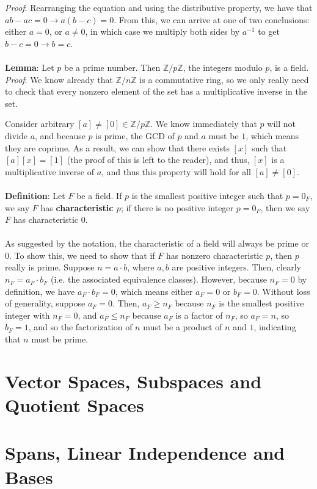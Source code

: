 \documentclass[11pt]{report}
\newcommand{\Z}{\mathbb{Z}}
\begin{document}
\textit{Proof}: Rearranging the equation and using the distributive property, we have that $ab - ac = 0 \rightarrow a(b-c) = 0$. From this, we can arrive at one of two conclusions: either $a = 0$, or $a \ne 0$, in which case we multiply both sides by $a^{-1}$ to get $b - c = 0 \rightarrow b = c$.
\\ \\
\textbf{Lemma}: Let $p$ be a prime number. Then $\Z/p\Z$, the integers modulo $p$, is a field. \\
\textit{Proof}: We know already that $\Z/n\Z$ is a commutative ring, so we only really need to check that every nonzero element of the set has a multiplicative inverse in the set. 

Consider arbitrary $[a] \ne [0] \in \Z/p\Z$. We know immediately that $p$ will not divide $a$, and because $p$ is prime, the GCD of $p$ and $a$ must be $1$, which means they are coprime. As a result, we can show that there exists $[x]$ such that $[a][x] = [1]$ (the proof of this is left to the reader), and thus, $[x]$ is a multiplicative inverse of $a$, and thus this property will hold for all $[a] \ne [0]$.
\\ \\
\textbf{Definition}: Let $F$ be a field. If $p$ is the smallest positive integer such that $p = 0_F$, we say $F$ has \textbf{characteristic $p$}; if there is no positive integer $p = 0_F$, then we say $F$ has characteristic $0$.
\\ \\
As suggested by the notation, the characteristic of a field will always be prime or $0$. To show this, we need to show that if $F$ has nonzero characteristic $p$, then $p$ really is prime. Suppose $n = a \cdot b$, where $a,b$ are positive integers. Then, clearly $n_F = a_F \cdot b_F$ (i.e. the associated equivalence classes). However, because $n_F = 0$ by definition, we have $a_F \cdot b_F = 0$, which means either $a_F = 0$ or $b_F = 0$. Without loss of generality, suppose $a_F = 0$. Then, $a_F \ge n_F$ because $n_F$ is the smallest positive integer with $n_F = 0$, and $a_F \le n_F$ because $a_F$ is a factor of $n_F$, so $a_F = n$, so $b_F = 1$, and so the factorization of $n$ must be a product of $n$ and $1$, indicating that $n$ must be prime.
\chapter{Vector Spaces, Subspaces and Quotient Spaces}


\chapter{Spans, Linear Independence and Bases}
\end{document}
